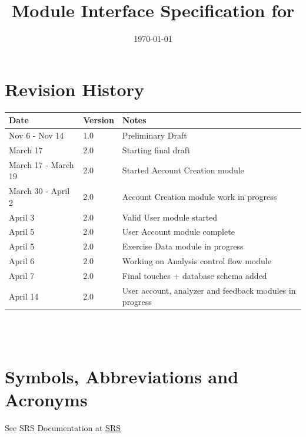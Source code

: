 \documentclass[12pt, titlepage]{article}
\begin{document}
\title{Module Interface Specification for \progname{}}

\author{\authname}

\date{\today}

\maketitle


\section{Revision History}

\begin{tabularx}{\textwidth}{p{3cm}p{2cm}X}
\toprule {\bf Date} & {\bf Version} & {\bf Notes}\\
\midrule
Nov 6 - Nov 14 & 1.0 & Preliminary Draft\\
March 17 & 2.0 & Starting final draft\\
March 17 - March 19 & 2.0 & Started Account Creation module\\
March 30 - April 2 & 2.0 & Account Creation module work in progress\\
April 3 & 2.0 & Valid User module started\\
April 5 & 2.0 & User Account module complete\\
April 5 & 2.0 & Exercise Data module in progress\\
April 6 & 2.0 & Working on Analysis control flow module\\
April 7 & 2.0 & Final touches + database schema added\\
April 14 & 2.0 & User account, analyzer and feedback modules in progress\\




\bottomrule
\end{tabularx}
\\
\\

\section{Symbols, Abbreviations and Acronyms}

See SRS Documentation at \href{https://github.com/M9Huynh/technically-functional/blob/main/docs/SRS/SRS.pdf}{SRS}

\newpage

\tableofcontents
\end{document}
